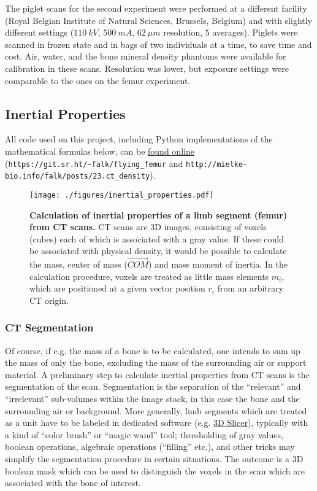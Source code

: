 The piglet scans for the second experiment were performed at a different facility (Royal Belgian Institute of Natural Sciences, Brussels, Belgium) and with slightly different settings (\(110\ kV\), \(500\ mA\), \(62\ \mu m\) resolution, \(5\) averages).
Piglets were scanned in frozen state and in bags of two individuals at a time, to save time and cost.
Air, water, and the bone mineral density phantoms were available for calibration in these scans.
Resolution was lower, but exposure settings were comparable to the ones on the femur experiment.
\subsection{Inertial Properties}
\label{sec:orgca7f176}

All code used on this project, including Python implementations of the mathematical formulas below, can be \href{https://git.sr.ht/\~falk/flying\_femur}{found online} (\nolinkurl{https://git.sr.ht/~falk/flying_femur} and \nolinkurl{http://mielke-bio.info/falk/posts/23.ct_density}).

\begin{figure}[p]
\centering
\texttt{[image: ./figures/inertial\_properties.pdf]}
\caption{\label{fig:inertials}\textbf{Calculation of inertial properties of a limb segment (femur) from CT scans.} CT scans are 3D images, consisting of voxels (cubes) each of which is associated with a gray value. If these could be associated with physical density, it would be possible to calculate the mass, center of mass (\(\vec{COM}\)) and mass moment of inertia. In the calculation procedure, voxels are treated as little mass elements \(m_{i}\), which are positioned at a given vector position \(r_{i}\) from an arbitrary CT origin.}
\end{figure}
\subsubsection{CT Segmentation}
\label{sec:orgc87d4fe}
Of course, if e.g. the mass of a bone is to be calculated, one intends to sum up the mass of only the bone, excluding the mass of the surrounding air or support material.
A preliminary step to calculate inertial properties from CT scans is the segmentation of the scan.
Segmentation is the separation of the ``relevant'' and ``irrelevant'' sub-volumes within the image stack, in this case the bone and the surrounding air or background.
More generally, limb segments which are treated as a unit have to be labeled in dedicated software (e.g. \href{https://www.slicer.org}{3D Slicer}), typically with a kind of ``color brush'' or ``magic wand'' tool; thresholding of gray values, boolean operations, algebraic operations (``filling'' etc.), and other tricks may simplify the segmentation procedure in certain situations.
The outcome is a 3D boolean mask which can be used to distinguish the voxels in the scan which are associated with the bone of interest.

